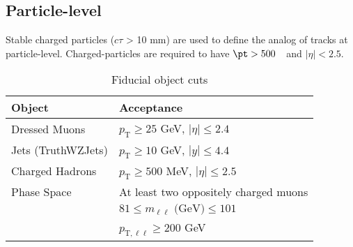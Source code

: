\subsection{Particle-level}

Stable charged particles ($c\tau$ > 10 mm) are used to define the analog of tracks at particle-level.  Charged-particles are required to have $\pt > 500$~\MeV~and $|\eta|<2.5$.

\begin{table}[h!]
    \centering
    \begin{tabular}{l|l}
    \hline
    \textbf{Object} & \textbf{Acceptance} \\ \hline
    Dressed Muons & $p_\text{T} \geq 25$ GeV, $|\eta| \leq 2.4$ \\\hline
    Jets (TruthWZJets) & $p_\text{T}\geq 10$ GeV, $|y|\leq4.4$ \\\hline
    Charged Hadrons & $p_\text{T} \geq 500$ MeV, $|\eta| \leq 2.5$  \\ \hline
    Phase Space & At least two oppositely charged muons \\
    & $81\leq m_{\ell\ell} \text{ (GeV)}\leq101$ \\
    & $p_{\text{T},\ell\ell}\geq200$ GeV \\ \hline
    \end{tabular}
    \caption{Fiducial object cuts}
    \label{tab:PLObjCuts}
\end{table}
